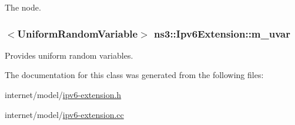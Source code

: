 The node. 

\subsubsection[{\texorpdfstring{m\+\_\+uvar}{m_uvar}}]{$<${\bf Uniform\+Random\+Variable}$>$ ns3\+::\+Ipv6\+Extension\+::m\+\_\+uvar\hspace{0.3cm}{\ttfamily [protected]}}\hypertarget{classns3_1_1Ipv6Extension_a785a3e81279962a9515646780b08e26a}{}\label{classns3_1_1Ipv6Extension_a785a3e81279962a9515646780b08e26a}


Provides uniform random variables. 



The documentation for this class was generated from the following files\+:\begin{DoxyCompactItemize}
\item 
internet/model/\hyperlink{ipv6-extension_8h}{ipv6-\/extension.\+h}\item 
internet/model/\hyperlink{ipv6-extension_8cc}{ipv6-\/extension.\+cc}\end{DoxyCompactItemize}
